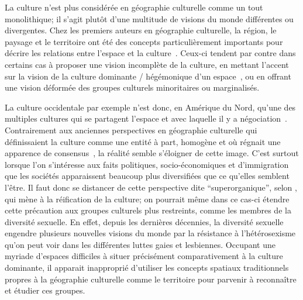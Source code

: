 La culture n'est plus considérée en géographie culturelle comme un tout monolithique; il s'agit plutôt d'une multitude de visions du monde différentes ou divergentes.
Chez les premiers auteurs en géographie culturelle, la région, le paysage et le territoire ont été des concepts particulièrement importants  pour décrire les relations entre l'espace et la culture~\citep{Bonnemaison1981,Monnet1998,DiMeo1998,}.
Ceux-ci tendent par contre dans certains cas à proposer une vision incomplète de la culture, en mettant l'accent sur la vision de la culture dominante / hégémonique d'un espace~\citep[11-12]{Duncan1993}, ou en offrant une vision déformée des groupes culturels minoritaires ou marginalisés.

La culture occidentale par exemple n'est donc, en Amérique du Nord, qu'une des multiples cultures qui se partagent l'espace et avec laquelle il y a négociation~\citep[11]{Duncan1993}.
Contrairement aux anciennes perspectives en géographie culturelle qui définissaient la culture comme une entité à part, homogène et où régnait une apparence de consensus~\citep{Duncan1980}, la réalité semble s'éloigner de cette image.
C'est surtout lorsque l'on s'intéresse aux faits politiques, socio-économiques et d'immigration que les sociétés apparaissent beaucoup plus diversifiées que ce qu'elles semblent l'être.
Il faut donc se distancer de cette perspective dite \enquote{superorganique}, selon \citet[198]{Duncan1980}, qui mène à la réification de la culture; on pourrait même dans ce cas-ci étendre cette précaution aux groupes culturels plus restreints, comme les membres de la diversité sexuelle.
En effet, depuis les dernières décennies, la diversité sexuelle engendre plusieurs nouvelles visions du monde par la résistance à l'hétérosexisme qu'on peut voir dans les différentes luttes gaies et lesbiennes.
Occupant une myriade d'espaces difficiles à situer précisément comparativement à la culture dominante, il apparait inapproprié d'utiliser les concepts spatiaux traditionnels propres à la géographie culturelle comme le territoire pour parvenir à reconnaître et étudier ces groupes.

